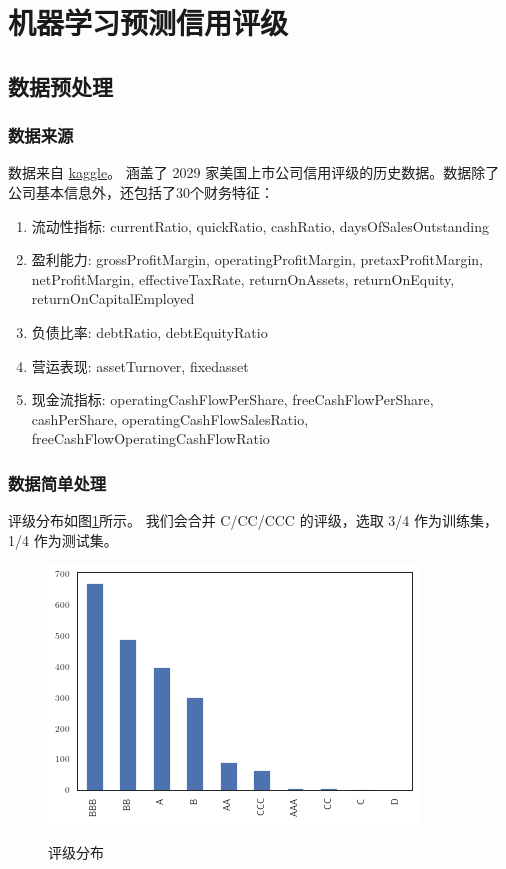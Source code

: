 \documentclass{ctexbeamer}
\begin{document}
\section{机器学习预测信用评级}
\subsection{数据预处理}
\begin{frame}
    \frametitle{数据来源}
    数据来自 \href{https://www.kaggle.com/datasets/agewerc/corporate-credit-rating}{kaggle}。
    涵盖了 2029 家美国上市公司信用评级的历史数据。数据除了公司基本信息外，还包括了30个财务特征：

    \begin{enumerate}
        \item 流动性指标: currentRatio, quickRatio, cashRatio, daysOfSalesOutstanding
        \item 盈利能力: grossProfitMargin, operatingProfitMargin, pretaxProfitMargin, netProfitMargin, effectiveTaxRate, returnOnAssets, returnOnEquity, returnOnCapitalEmployed
        \item 负债比率: debtRatio, debtEquityRatio
        \item 营运表现: assetTurnover, fixedasset
        \item 现金流指标: operatingCashFlowPerShare, freeCashFlowPerShare, cashPerShare, operatingCashFlowSalesRatio, freeCashFlowOperatingCashFlowRatio
    \end{enumerate}
\end{frame}
\begin{frame}[fragile]
    \frametitle{数据简单处理}
    评级分布如图\ref{rating}所示。
    我们会合并 C/CC/CCC 的评级，选取 3/4 作为训练集，1/4 作为测试集。
    \begin{figure}
        \includegraphics[width=0.6\linewidth]{../lib/rating.png}
        \label{rating}
        \caption{评级分布}
    \end{figure}
\end{frame}
\end{document}

